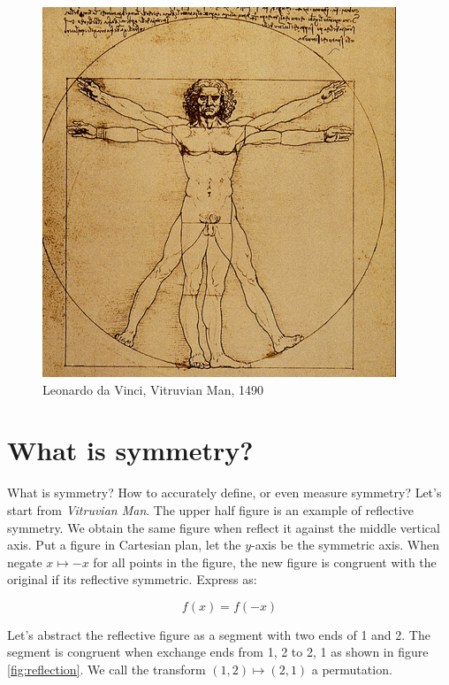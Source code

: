 \documentclass[b5paper]{article}
\begin{document}
\begin{figure}[htbp]
 \centering
 \includegraphics[scale=0.35]{img/vitruvian-man}
 \captionsetup{labelformat=empty}
 \caption{Leonardo da Vinci, Vitruvian Man, 1490}
\end{figure}

\section{What is symmetry?}
What is symmetry? How to accurately define, or even measure symmetry? Let's start from {\em Vitruvian Man}. The upper half figure is an example of reflective symmetry. We obtain the same figure when reflect it against the middle vertical axis. Put a figure in Cartesian plan, let the $y$-axis be the symmetric axis. When negate $x \mapsto -x$ for all points in the figure, the new figure is congruent with the original if its reflective symmetric. Express as:

\[
f(x) = f(-x)
\]

Let's abstract the reflective figure as a segment with two ends of 1 and 2. The segment is congruent when exchange ends from 1, 2 to 2, 1 as shown in figure \ref{fig:reflection}. We call the transform $(1, 2) \mapsto (2, 1)$ a permutation.
\end{document}

